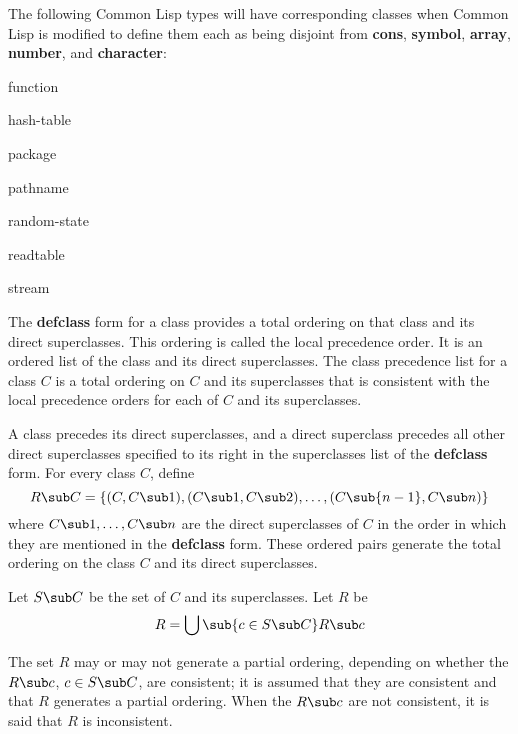 \newpage

The following Common Lisp types will have corresponding classes when
Common Lisp is modified to define them each as being disjoint from {\bf
cons}, {\bf symbol}, {\bf array}, {\bf number}, and {\bf character}:

\beginlist

\item{\bull} function
\item{\bull} hash-table
\item{\bull} package
\item{\bull} pathname
\item{\bull} random-state
\item{\bull} readtable
\item{\bull} stream

\endlist

\endSection%


The {\bf defclass} form for a class provides a total ordering on that
class and its direct superclasses.  This ordering is called the {\bit
local precedence order}.  It is an ordered list of the class and its
direct superclasses. The {\bit class precedence list\/} for a
class $C$ is a total ordering on $C$ and its superclasses that is consistent
with the local precedence orders for each of $C$ and its superclasses.

A class precedes its direct superclasses, and a
direct superclass precedes all other direct superclasses specified to
its right in the superclasses list of the {\bf defclass} form.  For
every class $C$, define $$R\sub C=\{(C,C\sub 1),(C\sub 1,C\sub
2),\ldots,(C\sub {n-1},C\sub n)\}$$ where $C\sub 1,\ldots,C\sub n$ are
the direct superclasses of $C$ in the order in which
they are mentioned in the {\bf defclass} form. These ordered pairs
generate the total ordering on the class $C$ and its direct
superclasses.

Let $S\sub C$ be the set of $C$ and its superclasses. Let $R$ be
$$R=\bigcup\sub{c\in {S\sub C}}R\sub c$$

The set $R$ may or may not generate a partial ordering, depending on
whether the $R\sub c$, $c\in S\sub C$, are consistent; it is assumed
that they are consistent and that $R$ generates a partial ordering.
When the $R\sub c$ are not consistent, it is said that $R$ is inconsistent.

%

